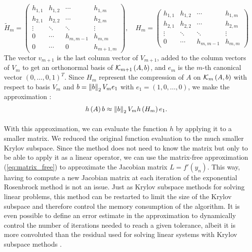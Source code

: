       \begin{equation}
        \tilde{H}_m = \begin{pmatrix}
          h_{1,1} & h_{1,2} & \cdots    & h_{1,m} \\
          h_{2,1} & h_{2,2} & \cdots    & h_{2,m} \\
          \vdots  & \ddots  & \ddots    & \vdots  \\
          0       & \cdots  & h_{m,m-1} & h_{m,m} \\
          0       & \cdots  & 0         & h_{m+1,m}
        \end{pmatrix} , \quad H_m = \begin{pmatrix}
          h_{1,1} & h_{1,2} & \cdots    & h_{1,m} \\
          h_{2,1} & h_{2,2} & \cdots    & h_{2,m} \\
          \vdots  & \ddots  & \ddots    & \vdots  \\
          0       & \cdots  & h_{m,m-1} & h_{m,m}
        \end{pmatrix}
      \end{equation}
      The vector $v_{m+1}$ is the last column vector of $V_{m+1}$, added to the column vectors of $V_m$ to get an orthonormal basis of $\krylov[A, b]{m+1}$, and $e_m$ is the $m$-th canonical vector $\left(0, \dots, 0, 1\right)^T$.
      Since $H_m$ represent the compression of $A$ on $\krylov[A, b]{m}$ with respect to basis $V_m$ and $b = \norm[2]{b} V_m e_1$ with $e_1 = \left(1, 0, \dots, 0\right)$, we make the approximation \cite{EiermannErnst2006}:
      \begin{equation}
        h\left(A\right)b \approx \norm[2]{b} V_m h\left(H_m\right) e_1 .
      \end{equation}

      \paragraph{}
      With this approximation, we can evaluate the function $h$ by applying it to a smaller matrix.
      We reduced the original function evaluation to the much smaller Krylov subspace.
      Since the method does not need to know the matrix but only to be able to apply it as a linear operator, we can use the matrix-free approximation (\ref{eq:matrix_free}) to approximate the Jacobian matrix $L = f'\left(y_n\right)$.
      This way, having to compute a new Jacobian matrix at each iteration of the exponential Rosenbrock method is not an issue.
      Just as Krylov subspace methods for solving linear problems, this method can be restarted to limit the size of the Krylov subspace and therefore control the memory consumption of the algorithm.
      It is even possible to define an error estimate in the approximation to dynamically control the number of iterations needed to reach a given tolerance, albeit it is more convoluted than the residual used for solving linear systems with Krylov subspace methods \cite{EiermannErnst2006}.

